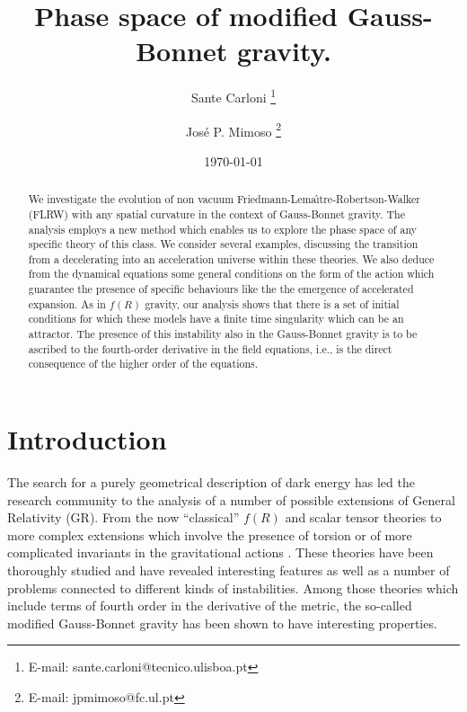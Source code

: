 \documentclass[a4paper,aps,onecolumn,nofootinbib]{revtex4}
\begin{document}
\title{Phase space of modified Gauss-Bonnet gravity.}
\author{Sante Carloni \footnote{E-mail: sante.carloni@tecnico.ulisboa.pt}}
\author{Jos\'{e} P. Mimoso \footnote{E-mail: jpmimoso@fc.ul.pt}}
\address{Faculdade de Ci\^{e}ncias, Departamento de F\'{\i}sica
\& Instituto de Astrof\'{\i}sica e Ci\^encias do Espa\c co, Universidade de Lisboa,
Ed. C8, Campo Grande, 1749-016 Lisboa,
Portugal}
\date{\today}
\begin{abstract}
We investigate the evolution of  non vacuum Friedmann-Lema\^{\i}tre-Robertson-Walker (FLRW) with any spatial curvature in the context of Gauss-Bonnet gravity. The analysis employs a new method which enables us to  explore the phase space of any specific theory of this class. We consider several examples, discussing the transition from a decelerating into an acceleration universe within these theories. We also deduce from the dynamical equations some general conditions on the form of the action which guarantee the presence of specific behaviours like the the emergence of accelerated expansion. As in $f(R)$ gravity, our analysis shows that there is a set of initial conditions for which these models have a finite time singularity which can be an attractor. The presence of this instability  also in  the Gauss-Bonnet gravity is to be ascribed to the fourth-order derivative in the field equations, i.e., is the direct consequence of the higher order of the equations. 

\end{abstract}
\maketitle


\section{Introduction}
The search for a purely geometrical description  of dark energy has 
 led the research community to the analysis of a number of 
possible extensions of General Relativity (GR). From the now ``classical'' $f(R)$ \cite{f(R) review} and scalar tensor \cite{ScTNBooks} theories to more complex extensions which involve the presence of torsion or of more complicated invariants in the gravitational actions \cite{Clifton:2011jh}. These theories have been thoroughly studied and have revealed interesting features as well as a number of problems connected to different kinds of instabilities. Among those theories which include terms of { fourth order} in the derivative of the metric, the so-called modified Gauss-Bonnet gravity has been shown to have interesting properties. 
\end{document}
